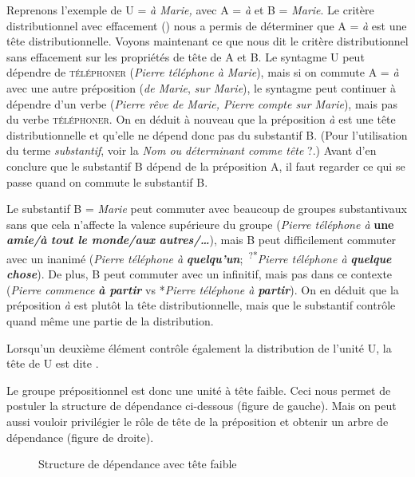 Reprenons l’exemple de U = \textit{à Marie,} avec A = \textit{à} et B = \textit{Marie}. Le critère distributionnel avec effacement () nous a permis de déterminer que A = \textit{à} est une tête distributionnelle. Voyons maintenant ce que nous dit le critère distributionnel sans effacement sur les propriétés de tête de A et B. Le syntagme U peut dépendre de \textsc{téléphoner} (\textit{Pierre téléphone à Marie}), mais si on commute A = \textit{à} avec une autre préposition (\textit{de Marie}, \textit{sur Marie}), le syntagme peut continuer à dépendre d’un verbe (\textit{Pierre rêve de Marie, Pierre compte sur Marie}), mais pas du verbe \textsc{téléphoner}. On en déduit à nouveau que la préposition \textit{à} est une tête distributionnelle et qu’elle ne dépend donc pas du substantif B. (Pour l’utilisation du terme \textit{substantif}, voir la  \textit{Nom ou déterminant comme tête} ?.) Avant d’en conclure que le substantif B dépend de la préposition A, il faut regarder ce qui se passe quand on commute le substantif B.

Le substantif B = \textit{Marie} peut commuter avec beaucoup de groupes substantivaux sans que cela n’affecte la valence supérieure du groupe (\textit{Pierre téléphone à}\textbf{ \textbf{une} \textit{amie/à} \textit{tout le monde/aux} \textit{autres/…}}), mais B peut difficilement commuter avec un inanimé (\textit{Pierre téléphone à} \textbf{\textit{quelqu’un}};~\textsuperscript{?*}\textit{Pierre téléphone à} \textbf{\textit{quelque chose}}). De plus, B peut commuter avec un infinitif, mais pas dans ce contexte (\textit{Pierre commence} \textbf{\textit{à partir}} vs *\textit{Pierre téléphone à} \textbf{\textit{partir}}). On en déduit que la préposition \textit{à} est plutôt la tête distributionnelle, mais que le substantif contrôle quand même une partie de la distribution.

{Lorsqu’un deuxième élément contrôle également la distribution de l’unité U, la tête de U est dite .}

Le groupe prépositionnel est donc une unité à tête faible. Ceci nous permet de postuler la structure de dépendance ci-dessous (figure de gauche). Mais on peut aussi vouloir privilégier le rôle de tête de la préposition et obtenir un arbre de dépendance (figure de droite).

\begin{figure}
\caption{Structure de dépendance avec tête faible}
\end{figure}

